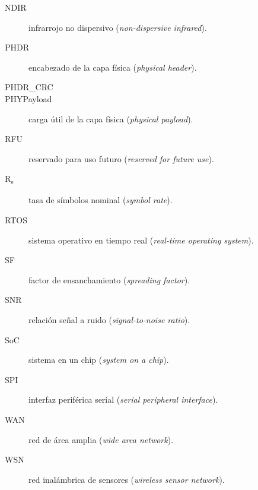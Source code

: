 \begin{description}
  \item[NDIR]
    infrarrojo no dispersivo (\emph{non-dispersive infrared}).
  \item[PHDR]
    encabezado de la capa física (\emph{physical header}).
  \item[PHDR\_CRC]
  \item[PHYPayload]
    carga útil de la capa física (\emph{physical payload}).
  \item[RFU]
    reservado para uso futuro (\emph{reserved for future use}).
  \item[R\textsubscript{s}]
    tasa de símbolos nominal (\emph{symbol rate}).
  \item[RTOS]
    sistema operativo en tiempo real (\emph{real-time operating system}).
  \item[SF]
    factor de ensanchamiento (\emph{spreading factor}).
  \item[SNR]
    relación señal a ruido (\emph{signal-to-noise ratio}).
  \item[SoC]
    sistema en un chip (\emph{system on a chip}).
  \item[SPI]
    interfaz periférica serial (\emph{serial peripheral interface}).
  \item[WAN]
    red de área amplia (\emph{wide area network}).
  \item[WSN]
    red inalámbrica de sensores (\emph{wireless sensor network}).
\end{description}